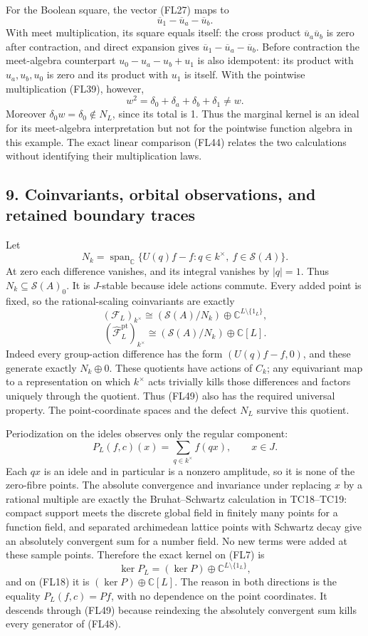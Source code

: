 \documentclass[
  10pt,
]{article}
\begin{document}
For the Boolean square, the vector (FL27) maps to \[
\overline u_1-\overline u_a-\overline u_b.
\tag{FL46}
\] With meet multiplication, its square equals itself: the cross product
\(\overline u_a\overline u_b\) is zero after contraction, and direct
expansion gives \(\overline u_1-\overline u_a-\overline u_b\). Before
contraction the meet-algebra counterpart \(u_0-u_a-u_b+u_1\) is also
idempotent: its product with \(u_a,u_b,u_0\) is zero and its product
with \(u_1\) is itself. With the pointwise multiplication (FL39),
however, \[
w^2=\delta_0+\delta_a+\delta_b+\delta_1\ne w.
\tag{FL47}
\] Moreover \(\delta_0w=\delta_0\notin N_L\), since its total is 1. Thus
the marginal kernel is an ideal for its meet-algebra interpretation but
not for the pointwise function algebra in this example. The exact linear
comparison (FL44) relates the two calculations without identifying their
multiplication laws.

\subsection{9. Coinvariants, orbital observations, and retained boundary
traces}\label{coinvariants-orbital-observations-and-retained-boundary-traces}

Let \[
N_k=\operatorname{span}_{\mathbb C}
\{U(q)f-f:q\in k^\times,\ f\in\mathcal S(A)\}.
\tag{FL48}
\] At zero each difference vanishes, and its integral vanishes by
\(|q|=1\). Thus \(N_k\subseteq\mathcal S(A)_0\). It is \(J\)-stable
because idele actions commute. Every added point is fixed, so the
rational-scaling coinvariants are exactly \[
(\mathcal F_L)_{k^\times}
\cong(\mathcal S(A)/N_k)\oplus\mathbb C^{L\setminus\{1_L\}},
\] \[
(\widehat{\mathcal F}_L^{\mathrm{pt}})_{k^\times}
\cong(\mathcal S(A)/N_k)\oplus\mathbb C[L].
\tag{FL49}
\] Indeed every group-action difference has the form \((U(q)f-f,0)\),
and these generate exactly \(N_k\oplus0\). These quotients have actions
of \(C_k\); any equivariant map to a representation on which
\(k^\times\) acts trivially kills those differences and factors uniquely
through the quotient. Thus (FL49) also has the required universal
property. The point-coordinate spaces and the defect \(N_L\) survive
this quotient.

Periodization on the ideles observes only the regular component: \[
P_L(f,c)(x)=\sum_{q\in k^\times}f(qx),\qquad x\in J.
\tag{FL50}
\] Each \(qx\) is an idele and in particular is a nonzero amplitude, so
it is none of the zero-fibre points. The absolute convergence and
invariance under replacing \(x\) by a rational multiple are exactly the
Bruhat--Schwartz calculation in TC18--TC19: compact support meets the
discrete global field in finitely many points for a function field, and
separated archimedean lattice points with Schwartz decay give an
absolutely convergent sum for a number field. No new terms were added at
these sample points. Therefore the exact kernel on (FL7) is \[
\ker P_L=(\ker P)\oplus\mathbb C^{L\setminus\{1_L\}},
\tag{FL51}
\] and on (FL18) it is \((\ker P)\oplus\mathbb C[L]\). The reason in
both directions is the equality \(P_L(f,c)=Pf\), with no dependence on
the point coordinates. It descends through (FL49) because reindexing the
absolutely convergent sum kills every generator of (FL48).
\end{document}
